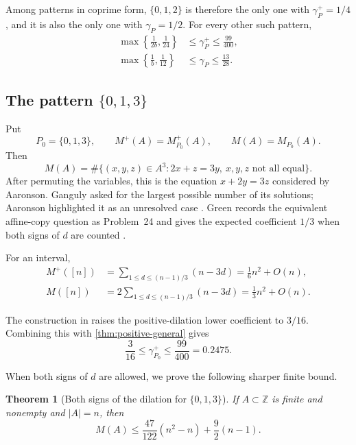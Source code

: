 \documentclass[11pt]{article}
\numberwithin{equation}{section}
\newtheorem{theorem}{Theorem}[section]
\theoremstyle{remark}
\newcommand{\Z}{\mathbb Z}
\begin{document}
Among patterns in coprime form, $\{0,1,2\}$ is therefore the only one with
$\gamma_P^+=1/4$, and it is also the only one with $\gamma_P=1/2$.  For
every other such pattern,
\begin{align}
 \max\left\{\frac1{2b},\frac1{24}\right\}
 &\le \gamma_P^+\le\frac{99}{400},
 \label{eq:general-new-window-plus}\\
 \max\left\{\frac1b,\frac1{12}\right\}
 &\le \gamma_P\le\frac{13}{28}.
 \label{eq:general-new-window}
\end{align}

\subsection*{The pattern $\{0,1,3\}$}
Put
\[
 P_0=\{0,1,3\},
 \qquad
 M^+(A)=M_{P_0}^+(A),
 \qquad
 M(A)=M_{P_0}(A).
\]
Then
\begin{equation}\label{eq:main-equation-intro}
 M(A)=\#\{(x,y,z)\in A^3:2x+z=3y,\ \text{$x,y,z$ not all equal}\}.
\end{equation}
After permuting the variables, this is the equation $x+2y=3z$ considered by
Aaronson.  Ganguly asked for the largest possible number of its solutions;
Aaronson highlighted it as an unresolved case \cite{Aaronson}.  Green
records the equivalent affine-copy question as Problem~24 and gives the
expected coefficient $1/3$ when both signs of $d$ are counted \cite{Green}.

For an interval,
\begin{align}
 M^+([n])
 &=\sum_{1\le d\le(n-1)/3}(n-3d)
 =\frac16n^2+O(n),
 \label{eq:interval-count-plus}\\
 M([n])
 &=2\sum_{1\le d\le(n-1)/3}(n-3d)
 =\frac13n^2+O(n).
 \label{eq:interval-count}
\end{align}

The construction in \cite{AFMKK} raises the positive-dilation lower
coefficient to $3/16$.  Combining this with
\cref{thm:positive-general} gives
\begin{equation}\label{eq:013-window-plus}
 \frac3{16}\le\gamma_{P_0}^+\le\frac{99}{400}=0.2475.
\end{equation}

When both signs of $d$ are allowed, we prove the following sharper finite
bound.
\begin{theorem}[Both signs of the dilation for $\{0,1,3\}$]
\label{thm:47-122}
If $A\subset\Z$ is finite and nonempty and $|A|=n$, then
\begin{equation}\label{eq:47-122-bound}
 M(A)
 \le \frac{47}{122}(n^2-n)+\frac92(n-1).
\end{equation}
\end{theorem}
\end{document}
